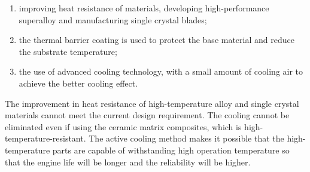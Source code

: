 \begin{enumerate}
\item improving heat resistance of materials, developing high-performance superalloy and manufacturing single crystal blades;
\item the thermal barrier coating is used to protect the base material and reduce the substrate temperature;
\item the use of advanced cooling technology, with a small amount of cooling air to achieve the better cooling effect.
\end{enumerate}

The improvement in heat resistance of high-temperature alloy and single crystal materials cannot meet the current design requirement. The cooling cannot be eliminated even if using the ceramic matrix composites, which is high-temperature-resistant. The active cooling method makes it possible that the high-temperature parts are capable of withstanding high operation temperature so that the engine life will be longer and the reliability will be higher.

